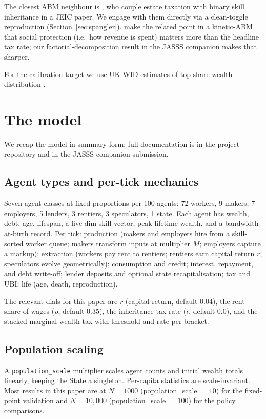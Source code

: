 \documentclass[11pt]{article}
\begin{document}
The closest ABM neighbour is \citet{spangler2022distribution}, who
couple estate taxation with binary skill inheritance in a JEIC paper.
We engage with them directly via a clean-toggle reproduction
(Section~\ref{sec:spangler}).  \citet{cardoso2025wealth} make the
related point in a kinetic-ABM that social protection (i.e.\ how
revenue is spent) matters more than the headline tax rate; our
factorial-decomposition result in the JASSS companion makes that
sharper.

For the calibration target we use UK WID estimates of top-share
wealth distribution \citep{saez2016wealth}.

\section{The model}
\label{sec:model}

We recap the model in summary form; full documentation is in the
project repository and in the JASSS companion submission.

\subsection{Agent types and per-tick mechanics}

Seven agent classes at fixed proportions per 100 agents: 72 workers,
9 makers, 7 employers, 5 lenders, 3 rentiers, 3 speculators, 1
state.  Each agent has wealth, debt, age, lifespan, a five-dim
skill vector, peak lifetime wealth, and a bandwidth-at-birth
record.  Per tick: production (makers and employers hire from a
skill-sorted worker queue; makers transform inputs at multiplier $M$;
employers capture a markup); extraction (workers pay rent to
rentiers; rentiers earn capital return $r$; speculators evolve
geometrically); consumption and credit; interest, repayment, and
debt write-off; lender deposits and optional state recapitalisation;
tax and UBI; life (age, death, reproduction).

The relevant dials for this paper are $r$ (capital return,
default $0.04$), the rent share of wages ($\rho$, default $0.35$),
the inheritance tax rate ($\iota$, default $0.0$), and the
stacked-marginal wealth tax with threshold and rate per bracket.

\subsection{Population scaling}

A \texttt{population\_scale} multiplier scales agent counts and
initial wealth totals linearly, keeping the State a singleton.
Per-capita statistics are scale-invariant.  Most results in this
paper are at $N = 1000$ (population\_scale $= 10$) for the fixed-
point validation and $N = 10{,}000$ (population\_scale $= 100$) for
the policy comparisons.
\end{document}
